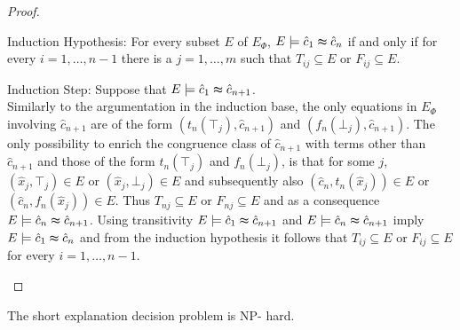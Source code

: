 \begin{proof}
\begin{paragraph}{Induction Hypothesis:} For every subset $E$ of $E_{\Phi}$, $E \models \hat{c}_1 \thickapprox \hat{c}_{n}$ if and only if for every $i = 1,\ldots,n-1$ there is a $j = 1,\ldots,m$ such that $T_{ij} \subseteq E$ or $F_{ij} \subseteq E$.
\end{paragraph}

\begin{paragraph}{Induction Step:}
Suppose that $E \models \hat{c}_1 \thickapprox \hat{c}_{n+1}$.\\
Similarly to the argumentation in the induction base, the only equations in $E_{\Phi}$ involving $\hat{c}_{n+1}$ are of the form $(t_n(\top_j),\hat{c}_{n+1})$ and $(f_n(\bot_j),\hat{c}_{n+1})$.
The only possibility to enrich the congruence class of $\hat{c}_{n+1}$ with terms other than $\hat{c}_{n+1}$ and those of the form $t_n(\top_j)$ and $f_n(\bot_j)$, 
is that for some $j$, $(\hat{x}_j,\top_j) \in E$ or $(\hat{x}_j,\bot_j) \in E$ and subsequently also $(\hat{c}_n,t_n(\hat{x}_j)) \in E$ or $(\hat{c}_n,f_n(\hat{x}_j)) \in E$.
Thus $T_{nj} \subseteq E$ or $F_{nj} \subseteq E$ and as a consequence $E \models \hat{c}_n \thickapprox \hat{c}_{n+1}$.
Using transitivity $E \models \hat{c}_1 \thickapprox \hat{c}_{n+1}$ and $E \models \hat{c}_n \thickapprox \hat{c}_{n+1}$ imply $E \models \hat{c}_1 \thickapprox \hat{c}_n$ and from the induction hypothesis it follows that  $T_{ij} \subseteq E$ or $F_{ij} \subseteq E$ for every $i = 1,\ldots,n-1$.
\end{paragraph}

\end{proof}

\begin{lemma}[NP- hardness]
\label{lemma:nphardness}
The short explanation decision problem is NP- hard.

\end{lemma}

